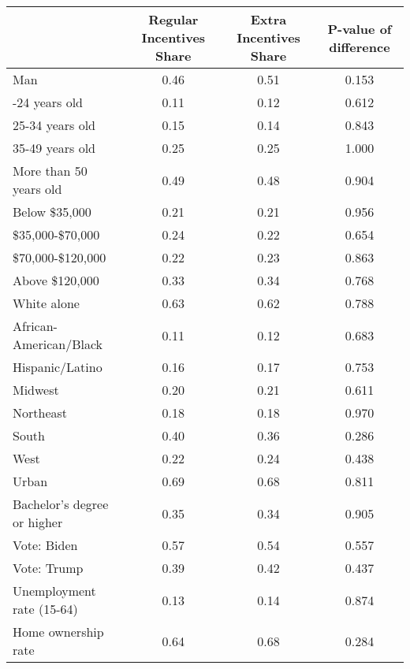 
\begin{tabular}[t]{lccc}
\toprule
  & Regular Incentives Share & Extra Incentives Share & P-value of difference\\
\midrule
Man & 0.46 & 0.51 & 0.153\\
\addlinespace
18-24 years old & 0.11 & 0.12 & 0.612\\
25-34 years old & 0.15 & 0.14 & 0.843\\
35-49 years old & 0.25 & 0.25 & 1.000\\
More than 50 years old & 0.49 & 0.48 & 0.904\\
\addlinespace
Below \$35,000 & 0.21 & 0.21 & 0.956\\
\$35,000-\$70,000 & 0.24 & 0.22 & 0.654\\
\$70,000-\$120,000 & 0.22 & 0.23 & 0.863\\
Above \$120,000 & 0.33 & 0.34 & 0.768\\
\addlinespace
White alone & 0.63 & 0.62 & 0.788\\
African-American/Black & 0.11 & 0.12 & 0.683\\
Hispanic/Latino & 0.16 & 0.17 & 0.753\\
\addlinespace
Midwest & 0.20 & 0.21 & 0.611\\
Northeast & 0.18 & 0.18 & 0.970\\
South & 0.40 & 0.36 & 0.286\\
West & 0.22 & 0.24 & 0.438\\
\addlinespace
Urban & 0.69 & 0.68 & 0.811\\
\addlinespace
Bachelor's degree or higher & 0.35 & 0.34 & 0.905\\
\addlinespace
Vote: Biden & 0.57 & 0.54 & 0.557\\
Vote: Trump & 0.39 & 0.42 & 0.437\\
\addlinespace
Unemployment rate (15-64) & 0.13 & 0.14 & 0.874\\
\addlinespace
Home ownership rate & 0.64 & 0.68 & 0.284\\
\bottomrule
\end{tabular}